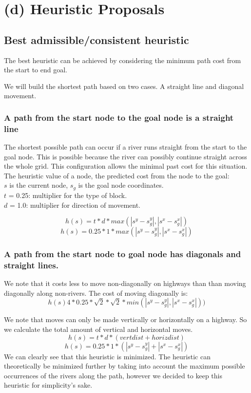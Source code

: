 \section{(d) Heuristic Proposals}



\subsection{Best admissible/consistent heuristic}

The best heuristic can be achieved by considering the minimum path cost from the start to end goal.

We will build the shortest path based on two cases. A straight line and diagonal movement.

\subsubsection{A path from the start node to the goal node is a straight line}

The shortest possible path can occur if a river runs straight from the start to the goal node. This is possible because the river can possibly continue straight across the whole grid. This configuration allows the minimal past cost for this situation. The heuristic value of a node, the predicted cost from the node to the goal:
\\ $s$ is the current node, $s_g$ is the goal node coordinates.
\\ $t$ = 0.25: multiplier for the type of block.
\\ $d$ = 1.0: multiplier for direction of movement.

\[h(s) = t * d  * max(|s^y - s_g^y|,|s^x - s_g^x|)\]
\[h(s) = 0.25 * 1 * max(|s^y - s_g^y|,|s^x - s_g^x|)\]


\subsubsection{A path from the start node to goal node has diagonals and straight lines.}

We note that it costs less to move non-diagonally on highways than than moving diagonally along non-rivers. The cost of moving diagonally is:
\[h(s) 4 * 0.25 * \sqrt{2} * \sqrt{2} * min(|s^y - s_g^y|,|s^x - s_g^x|))\]

We note that moves can only be made vertically or horizontally on a highway. So we calculate the total amount of vertical and horizontal moves.
\[h(s) = t * d  * (vert dist + horiz dist) \]
\[h(s) = 0.25 * 1 * ( |s^y - s_g^y| + |s^x - s_g^x| )\]
We can clearly see that this heuristic is minimized. The heuristic can theoretically be minimized further by taking into account the maximum possible occurrences of the rivers along the path, however we decided to keep this heuristic for simplicity's sake.


